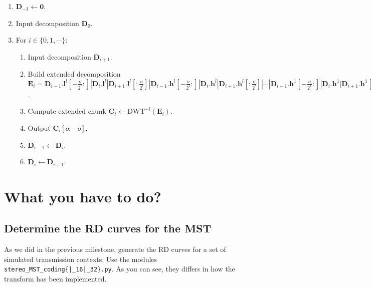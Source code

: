 \begin{enumerate}
\item ${\mathbf D}_{-1}\leftarrow{\mathbf 0}$.
\item Input decomposition ${\mathbf D}_0$.
\item For $i\in\{0,1,\cdots\}$:
  \begin{enumerate}
  \item Input decomposition ${\mathbf D}_{i+1}$.
  \item Build extended decomposition ${\mathbf E}_i =
    {\mathbf D}_{i-1}.{\mathbf l}^l[-\frac{o}{2^l}:]|{\mathbf D}_i.{\mathbf l}^l|{\mathbf D}_{i+1}.{\mathbf l}^l[:\frac{o}{2^l}]|{\mathbf D}_{i-1}.{\mathbf h}^l[-\frac{o}{2^l}:]|{\mathbf D}_i.{\mathbf h}^l|{\mathbf D}_{i+1}.{\mathbf h}^l[:\frac{o}{2^l}]|\cdots|{\mathbf D}_{i-1}.{\mathbf h}^1[-\frac{o}{2^1}:]|{\mathbf D}_i.{\mathbf h}^1|{\mathbf D}_{i+1}.{\mathbf h}^1[:\frac{o}{2^1}]$.
  \item Compute extended chunk ${\mathbf C}_i\leftarrow\text{DWT}^{-l}({\mathbf E}_i)$.
  \item Output ${\mathbf C}_i[o:-o]$.
  \item ${\mathbf D}_{i-1} \leftarrow {\mathbf D}_i$.
  \item ${\mathbf D}_i \leftarrow {\mathbf D}_{i+1}$.
  \end{enumerate}
\end{enumerate}





\section{What you have to do?}

\subsection{Determine the RD curves for the MST}
As we did in the previous milestone, generate the RD curves for a set
of simulated transmission contexts. Use the modules
\texttt{stereo\_MST\_coding\{|\_16|\_32\}.py}. As you can see, they
differs in how the transform has been implemented.

